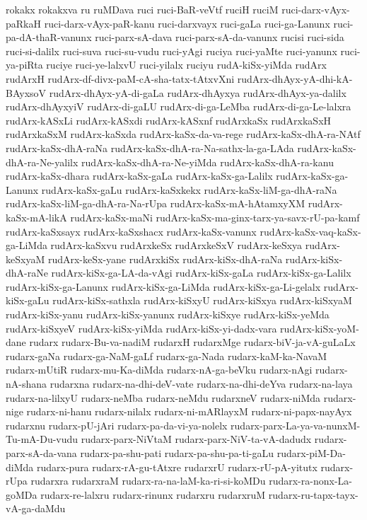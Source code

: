 {rokakx
rokakxva
ru
ruMDava
ruci
ruci-BaR-veVtf
ruciH
ruciM
ruci-darx-vAyx-paRkaH
ruci-darx-vAyx-paR-kanu
ruci-darxvayx
ruci-gaLa
ruci-ga-Lanunx
ruci-pa-dA-thaR-vanunx
ruci-parx-sA-dava
ruci-parx-sA-da-vanunx
rucisi
ruci-sida
ruci-si-dalilx
ruci-suva
ruci-su-vudu
ruci-yAgi
ruciya
ruci-yaMte
ruci-yanunx
ruci-ya-piRta
ruciye
ruci-ye-lalxvU
ruci-yilalx
ruciyu
rudA-kiSx-yiMda
rudArx
rudArxH
rudArx-df-divx-paM-cA-sha-tatx-tAtxvXni
rudArx-dhAyx-yA-dhi-kA-BAyxsoV
rudArx-dhAyx-yA-di-gaLa
rudArx-dhAyxya
rudArx-dhAyx-ya-dalilx
rudArx-dhAyxyiV
rudArx-di-gaLU
rudArx-di-ga-LeMba
rudArx-di-ga-Le-lalxra
rudArx-kASxLi
rudArx-kASxdi
rudArx-kASxnf
rudArxkaSx
rudArxkaSxH
rudArxkaSxM
rudArx-kaSxda
rudArx-kaSx-da-va-rege
rudArx-kaSx-dhA-ra-NAtf
rudArx-kaSx-dhA-raNa
rudArx-kaSx-dhA-ra-Na-sathx-la-ga-LAda
rudArx-kaSx-dhA-ra-Ne-yalilx
rudArx-kaSx-dhA-ra-Ne-yiMda
rudArx-kaSx-dhA-ra-kanu
rudArx-kaSx-dhara
rudArx-kaSx-gaLa
rudArx-kaSx-ga-Lalilx
rudArx-kaSx-ga-Lanunx
rudArx-kaSx-gaLu
rudArx-kaSxkekx
rudArx-kaSx-liM-ga-dhA-raNa
rudArx-kaSx-liM-ga-dhA-ra-Na-rUpa
rudArx-kaSx-mA-hAtamxyXM
rudArx-kaSx-mA-likA
rudArx-kaSx-maNi
rudArx-kaSx-ma-ginx-tarx-ya-savx-rU-pa-kamf
rudArx-kaSxsayx
rudArx-kaSxshacx
rudArx-kaSx-vanunx
rudArx-kaSx-vaq-kaSx-ga-LiMda
rudArx-kaSxvu
rudArxkeSx
rudArxkeSxV
rudArx-keSxya
rudArx-keSxyaM
rudArx-keSx-yane
rudArxkiSx
rudArx-kiSx-dhA-raNa
rudArx-kiSx-dhA-raNe
rudArx-kiSx-ga-LA-da-vAgi
rudArx-kiSx-gaLa
rudArx-kiSx-ga-Lalilx
rudArx-kiSx-ga-Lanunx
rudArx-kiSx-ga-LiMda
rudArx-kiSx-ga-Li-gelalx
rudArx-kiSx-gaLu
rudArx-kiSx-sathxla
rudArx-kiSxyU
rudArx-kiSxya
rudArx-kiSxyaM
rudArx-kiSx-yanu
rudArx-kiSx-yanunx
rudArx-kiSxye
rudArx-kiSx-yeMda
rudArx-kiSxyeV
rudArx-kiSx-yiMda
rudArx-kiSx-yi-dadx-vara
rudArx-kiSx-yoM-dane
rudarx
rudarx-Bu-va-nadiM
rudarxH
rudarxMge
rudarx-biV-ja-vA-guLaLx
rudarx-gaNa
rudarx-ga-NaM-gaLf
rudarx-ga-Nada
rudarx-kaM-ka-NavaM
rudarx-mUtiR
rudarx-mu-Ka-diMda
rudarx-nA-ga-beVku
rudarx-nAgi
rudarx-nA-shana
rudarxna
rudarx-na-dhi-deV-vate
rudarx-na-dhi-deYva
rudarx-na-laya
rudarx-na-lilxyU
rudarx-neMba
rudarx-neMdu
rudarxneV
rudarx-niMda
rudarx-nige
rudarx-ni-hanu
rudarx-nilalx
rudarx-ni-mARlayxM
rudarx-ni-papx-nayAyx
rudarxnu
rudarx-pU-jAri
rudarx-pa-da-vi-ya-nolelx
rudarx-parx-La-ya-va-nunxM-Tu-mA-Du-vudu
rudarx-parx-NiVtaM
rudarx-parx-NiV-ta-vA-dadudx
rudarx-parx-sA-da-vana
rudarx-pa-shu-pati
rudarx-pa-shu-pa-ti-gaLu
rudarx-piM-Da-diMda
rudarx-pura
rudarx-rA-gu-tAtxre
rudarxrU
rudarx-rU-pA-yitutx
rudarx-rUpa
rudarxra
rudarxraM
rudarx-ra-na-laM-ka-ri-si-koMDu
rudarx-ra-nonx-La-goMDa
rudarx-re-lalxru
rudarx-rinunx
rudarxru
rudarxruM
rudarx-ru-tapx-tayx-vA-ga-daMdu
}
